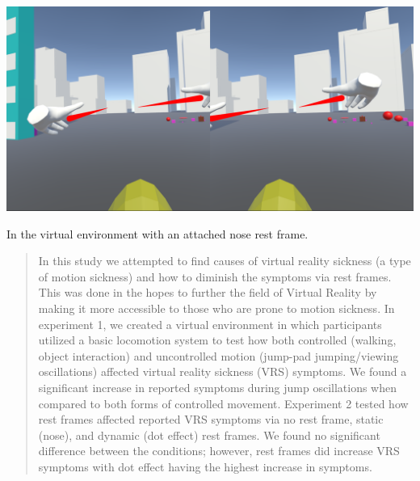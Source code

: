 \documentclass[sigconf]{acmart}
\begin{document}
\author{Brendan Nolan}
\begin{teaserfigure}
  \includegraphics[width=\textwidth]{samples/Nose VR.png}
  \caption{In the virtual environment with an attached nose rest frame.}
  \label{fig:teaser}
\end{teaserfigure}
\renewcommand{\shortauthors}{Bosch, et al.}
\begin{abstract}
In this study we attempted to find causes of virtual reality sickness (a type of motion sickness) and how to diminish the symptoms via rest frames. This was done in the hopes to further the field of Virtual Reality by making it more accessible to those who are prone to motion sickness. In experiment 1, we created a virtual environment in which participants utilized a basic locomotion system to test how both controlled (walking, object interaction) and uncontrolled motion (jump-pad jumping/viewing oscillations) affected virtual reality sickness (VRS) symptoms. We found a significant increase in reported symptoms during jump oscillations when compared to both forms of controlled movement. Experiment 2 tested how rest frames affected reported VRS symptoms via no rest frame, static (nose), and dynamic (dot effect) rest frames. We found no significant difference between the conditions; however, rest frames did increase VRS symptoms with dot effect having the highest increase in symptoms.
\end{abstract}
\end{document}

